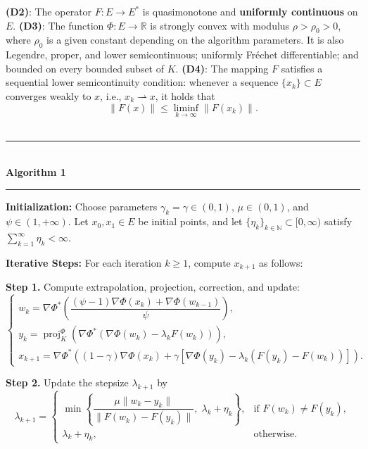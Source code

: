 \documentclass[hidelinks,11 pt]{article}
\numberwithin{equation}{section}
\theoremstyle{definition}  %
\numberwithin{equation}{section}
\numberwithin{theorem}{section}
\begin{document}
\vskip 2mm
\textbf{(D2)}: The operator \( F:E \to E^* \) is quasimonotone and \textbf{uniformly continuous} on $E$.
\vskip 2mm
\vskip 2mm
\textbf{(D3)}: The function $\Phi:E\to \mathbb{R}$ is strongly convex with modulus $\rho>\rho_{0}>0$, where $\rho_{0}$ is a given constant depending on the algorithm parameters. It is also Legendre, proper, and lower semicontinuous; uniformly Fréchet differentiable; and bounded on every bounded subset of $K$.
\vskip 2mm 
\textbf{(D4)}: The mapping \( F \) satisfies a sequential lower semicontinuity condition: whenever a sequence \( \{x_k\} \subset E \) converges weakly to \( x \), i.e., \( x_k \rightharpoonup x \), it holds that
\[
\|F(x)\| \leq \liminf_{k \to \infty} \|F(x_k)\|.
\]
\\
\noindent\rule[0.25\baselineskip]{\textwidth}{0.5pt}\\
\textbf{Algorithm 1}\\
\noindent\rule[0.25\baselineskip]{\textwidth}{0.5pt}

\vskip 1mm
\textbf{Initialization:} 
Choose parameters $\gamma_k = \gamma \in (0,1)$, $\mu \in (0,1)$, and $\psi \in (1, +\infty)$. 
Let $x_0, x_1 \in E$ be initial points, and let $\{\eta_k\}_{k\in\mathbb{N}} \subset [0, \infty)$ satisfy $\sum_{k=1}^{\infty} \eta_k < \infty$.

\vskip 2mm
\textbf{Iterative Steps:} For each iteration $k \geq 1$, compute $x_{k+1}$ as follows:

\vskip 2mm
\textbf{Step 1.} Compute extrapolation, projection, correction, and update:
\begin{equation*}
\begin{cases}
w_k = \nabla \Phi^{*} \left( \dfrac{(\psi - 1)\nabla \Phi(x_k) + \nabla \Phi(w_{k-1})}{\psi} \right), \\[1.5ex]
y_k = \operatorname{proj}_K^{\Phi} \left( \nabla \Phi^{*} \left( \nabla \Phi(w_k) - \lambda_k F(w_k) \right) \right), \\[1.5ex]
x_{k+1} = \nabla \Phi^{*} \left( (1 - \gamma) \nabla \Phi(x_k) + \gamma \left[ \nabla \Phi(y_k) - \lambda_k (F(y_k) - F(w_k)) \right] \right).
\end{cases}
\end{equation*}

\vskip 2mm
\textbf{Step 2.} Update the stepsize $\lambda_{k+1}$ by
\begin{equation}\label{e18}
\lambda_{k+1} =
\begin{cases}
\min\left\{ \dfrac{\mu \|w_k - y_k\|}{\|F(w_k) - F(y_k)\|},\; \lambda_k + \eta_k \right\}, & \text{if } F(w_k) \neq F(y_k), \\[1.5ex]
\lambda_k  + \eta_k, & \text{otherwise}.
\end{cases}
\end{equation}
\end{document}

